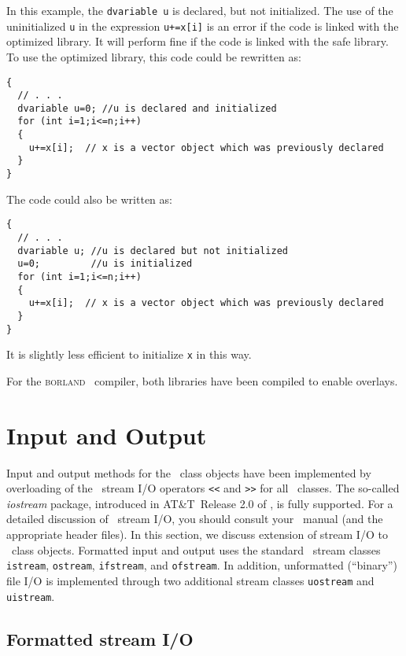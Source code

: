 \documentclass{admbmanual}
\begin{document}
In this example, the \texttt{dvariable u} is declared, but not initialized. The
use of the uninitialized \texttt{u} in the expression \texttt{u+=x[i]} is an
error if the code is linked with the optimized library. It will perform fine if
the code is linked with the safe library. To use the optimized library, this
code could be rewritten as:
\begin{lstlisting}
{
  // . . .
  dvariable u=0; //u is declared and initialized
  for (int i=1;i<=n;i++)
  {
    u+=x[i];  // x is a vector object which was previously declared
  }
}
\end{lstlisting}
The code could also be written as:
\begin{lstlisting}
{
  // . . .
  dvariable u; //u is declared but not initialized
  u=0;         //u is initialized
  for (int i=1;i<=n;i++)
  {
    u+=x[i];  // x is a vector object which was previously declared
  }
}
\end{lstlisting}
It is slightly less efficient to initialize \texttt{x} in this way.

For the \textsc{borland} \cplus\ compiler, both libraries have been compiled to
enable overlays.



\chapter{Input and Output}

Input and output methods for the \scAD\ class objects have been implemented by
overloading of the \cplus\ stream I/O operators \texttt{<{}<} and \texttt{>{}>}
for all \scAD\ classes. The so-called \textit{iostream} package, introduced in
AT\&T~Release 2.0 of \cplus, is fully supported. For a detailed discussion of
\cplus\ stream I/O, you should consult your \cplus\ manual (and the appropriate
header files). In this section, we discuss extension of stream I/O to \scAD\
class objects. Formatted input and output uses the standard \cplus\ stream
classes \texttt{istream}, \texttt{ostream}, \texttt{ifstream}, and
\texttt{ofstream}. In addition, unformatted (``binary'') file I/O is implemented
through two additional stream classes \texttt{uostream} and \texttt{uistream}.

\section{Formatted stream I/O}
\end{document}
